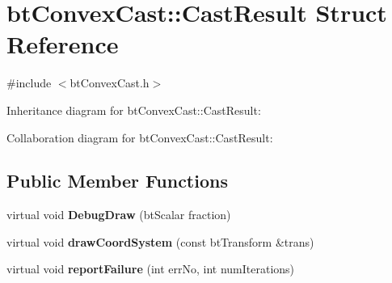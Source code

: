 \hypertarget{structbt_convex_cast_1_1_cast_result}{\section{bt\+Convex\+Cast\+:\+:Cast\+Result Struct Reference}
\label{structbt_convex_cast_1_1_cast_result}
}


{\ttfamily \#include $<$bt\+Convex\+Cast.\+h$>$}



Inheritance diagram for bt\+Convex\+Cast\+:\+:Cast\+Result\+:


Collaboration diagram for bt\+Convex\+Cast\+:\+:Cast\+Result\+:
\subsection*{Public Member Functions}
\begin{DoxyCompactItemize}
\item 
\hypertarget{structbt_convex_cast_1_1_cast_result_afebcf038c88ef123c0570d5ab79cb3c6}{virtual void {\bfseries Debug\+Draw} (bt\+Scalar fraction)}\label{structbt_convex_cast_1_1_cast_result_afebcf038c88ef123c0570d5ab79cb3c6}

\item 
\hypertarget{structbt_convex_cast_1_1_cast_result_afd262451a525bb528a1b6ae9cff66f03}{virtual void {\bfseries draw\+Coord\+System} (const bt\+Transform \&trans)}\label{structbt_convex_cast_1_1_cast_result_afd262451a525bb528a1b6ae9cff66f03}

\item 
\hypertarget{structbt_convex_cast_1_1_cast_result_aabe1caaf55dc1dbe884cb0c188de12da}{virtual void {\bfseries report\+Failure} (int err\+No, int num\+Iterations)}\label{structbt_convex_cast_1_1_cast_result_aabe1caaf55dc1dbe884cb0c188de12da}

\end{DoxyCompactItemize}

